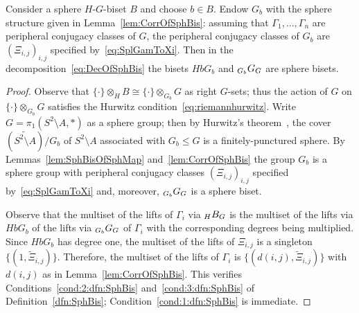\documentclass{amsart}
\begin{document}
\begin{lem}\label{lem:CorrOfSphBis2}
  Consider a sphere $H$-$G$-biset $B$ and choose $b\in B$. Endow
  $G_b$ with the sphere structure given in Lemma~\ref{lem:CorrOfSphBis}:
  assuming that $\Gamma_1,\dots,\Gamma_n$ are peripheral conjugacy
  classes of $G$, the peripheral conjugacy classes of $G_b$ are
  $(\Xi_{i,j})_{i,j}$ specified by~\eqref{eq:SplGamToXi}. Then in the
  decomposition~\eqref{eq:DecOfSphBis} the bisets $H b G_b$ and
  $\subscript{G_b}G_G$ are sphere bisets.
\end{lem}
\begin{proof}
  Observe that $\{\cdot\}\otimes_H B \cong \{\cdot\}\otimes_{G_b} G$
  as right $G$-sets; thus the action of $G$ on $\{\cdot\}\otimes_{G_b}
  G$ satisfies the Hurwitz condition~\eqref{eq:riemannhurwitz}. Write
  $G=\pi_1(S^2\setminus A,*)$ as a sphere group; then by Hurwitz's
  theorem~\cite{hurwitz:ramifiedsurfaces}, the cover
  $(\widetilde{S^2\setminus A})/G_b$ of $S^2\setminus A$ associated
  with $G_b\le G$ is a finitely-punctured sphere. By
  Lemmas~\ref{lem:SphBisOfSphMap} and~\ref{lem:CorrOfSphBis} the group
  $G_b$ is a sphere group with peripheral conjugacy classes
  $(\Xi_{i,j})_{i,j}$ specified by~\eqref{eq:SplGamToXi} and,
  moreover, $\subscript{G_b}G_G$ is a sphere biset.
  
  Observe that the multiset of the lifts of $\Gamma_i$ via $\subscript H B_G$
  is the multiset of the lifts via $H b G_b$ of the lifts via
  $\subscript{G_b}G_G$ of $\Gamma_i$ with the corresponding degrees being
  multiplied. Since $H b G_b$ has degree one, the multiset of the lifts
  of $\Xi_{i,j}$ is a singleton $\{(1,\widetilde \Xi_{i,j})\}.$
  Therefore, the multiset of the lifts of $\Gamma_i$ is
  $\{(d(i,j),\widetilde \Xi_{i,j})\}$ with $d(i,j)$ as in
  Lemma~\ref{lem:CorrOfSphBis}. This verifies
  Conditions~\eqref{cond:2:dfn:SphBis} and~\eqref{cond:3:dfn:SphBis}
  of Definition~\ref{dfn:SphBis}; Condition~\eqref{cond:1:dfn:SphBis}
  is immediate.
\end{proof}
\end{document}
